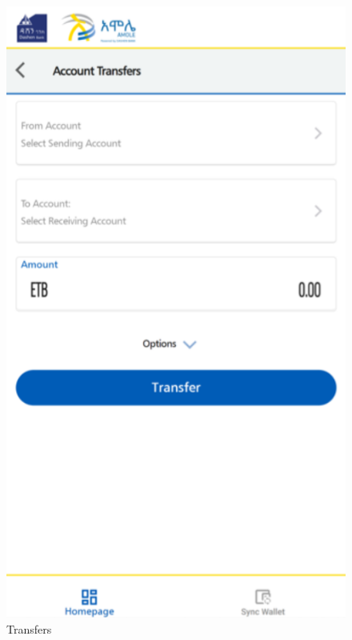 \documentclass[a4paper,12pt]{report}
\begin{document}
\begin{figure}[h]
\begin{minipage}[b]{0.3\textwidth}
    \includegraphics[width=\linewidth]{../images/screenshots/amole-lite/amole_transfers.png}
    \caption{Transfers}
  \end{minipage}
\end{figure}
\end{document}
